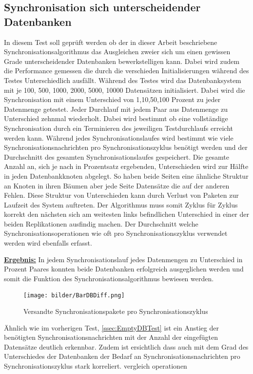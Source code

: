 \documentclass[a4paper,11pt,oneside,%
headsepline,												%
footsepline,												%
bibtotocnumbered									%
]{scrreprt}
\begin{document}
\subsection{Synchronisation sich unterscheidender Datenbanken}
\label{ssec:DiffThroughLost}
In diesem Test soll geprüft werden ob der in dieser Arbeit beschriebene Synchronisationsalgorithmus das Ausgleichen zweier sich um einen gewissen Grade unterscheidender Datenbanken bewerkstelligen kann. Dabei wird zudem die Performance gemessen die durch die verschieden Initialisierungen während des Testes Unterschiedlich ausfällt. Während des Testes wird das Datenbanksystem mit je 100, 500, 1000, 2000, 5000, 10000 Datensätzen initialisiert. Dabei wird die Synchronisation mit einem Unterschied von 1,10,50,100 Prozent zu jeder Datenmenge getestet. Jeder Durchlauf mit jedem Paar aus Datenmenge zu Unterschied zehnmal wiederholt. Dabei wird bestimmt ob eine vollständige Synchronisation durch ein Terminieren des jeweiligen Testdurchlaufs erreicht werden kann. Während jedes Synchronisationslaufes wird bestimmt wie viele Synchronisationsnachrichten pro Synchronisationszyklus benötigt werden und der Durchschnitt des gesamten Synchronisationslaufes gespeichert. Die gesamte Anzahl an, sich je nach in Prozentsatz ergebenden, Unterschieden wird zur Hälfte in jeden Datenbankknoten abgelegt. So haben beide Seiten eine ähnliche Struktur an Knoten in ihren Bäumen aber jede Seite Datensätze die auf der anderen Fehlen. Diese Struktur von Unterschieden kann durch Verlust von Paketen zur Laufzeit des System auftreten. Der Algorithmus muss somit Zyklus für Zyklus korrekt den nächsten sich am weitesten links befindlichen Unterschied in einer der beiden Replikationen ausfindig machen. Der Durchschnitt welche Synchronisationsoperationen wie oft pro Synchronisationszyklus verwendet werden wird ebenfalls erfasst.

\underline{{\bf Ergebnis:}} In jedem Synchronisationslauf jedes Datenmengen zu Unterschied in Prozent Paares konnten beide Datenbanken erfolgreich ausgeglichen werden und somit die Funktion des Synchronisationsalgorithmus bewiesen werden.
\begin{figure}[h!]
  \begin{center}
    \texttt{[image: bilder/BarDBDiff.png]}
  \end{center}
 \caption{Versandte Synchronisationspakete pro Synchronisationszyklus}
  \label{fig:EmptyDiffTraffic}
\end{figure}
 Ähnlich wie im vorherigen Test, \autoref{ssec:EmptyDBTest} ist ein Anstieg der benötigten Synchronisationsnachrichten mit der Anzahl der eingefügten Datensätze deutlich erkennbar. Zudem ist ersichtlich dass auch mit dem Grad des Unterschiedes der Datenbanken der Bedarf an Synchronisationsnachrichten pro Synchronisationszyklus stark korreliert. %
 vergleich operationen
\end{document}
